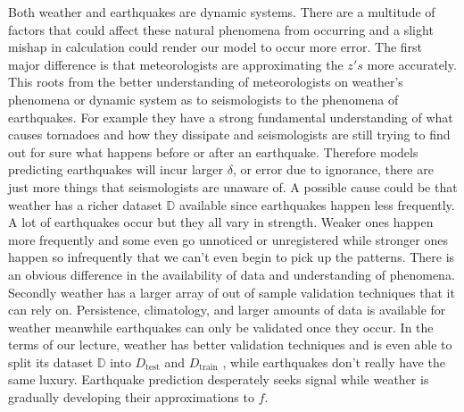 \documentclass[12pt]{article}
\begin{document}
\begin{enumerate}
Both weather and earthquakes are dynamic systems. There are a multitude of factors that could affect these natural phenomena from occurring and a slight mishap in calculation could render our model to occur more error. The first major difference is that meteorologists are approximating the \( z's \) more accurately. This roots from the better understanding of meteorologists on weather's phenomena or dynamic system as to seismologists to the phenomena of earthquakes. For example they have a strong fundamental understanding of what causes tornadoes and how they dissipate and seismologists are still trying to find out for sure what happens before or after an earthquake. Therefore models predicting earthquakes will incur larger \( \delta \), or error due to ignorance, there are just more things that seismologists are unaware of. A possible cause could be that weather has a richer dataset \( \mathbb{D} \) available since earthquakes happen less frequently. A lot of earthquakes occur but they all vary in strength. Weaker ones happen more frequently and some even go unnoticed or unregistered while stronger ones happen so infrequently that we can't even begin to pick up the patterns. There is an obvious difference in the availability of data and understanding of phenomena. Secondly weather has a larger array of out of sample validation techniques that it can rely on. Persistence, climatology, and larger amounts of data is available for weather meanwhile earthquakes can only be validated once they occur. In the terms of our lecture, weather has better validation techniques and is even able to split its dataset \( \mathbb{D} \)  into  \( D_{\text{test}} \) and \( D_{\text{train}} \)
, while earthquakes don't really have the same luxury. Earthquake prediction desperately seeks signal while weather is gradually developing their approximations to \( f \). \\  \\
 \\ 


\end{enumerate}
\end{document}
